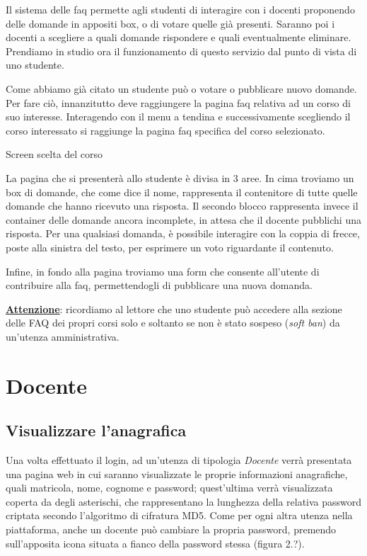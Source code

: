 \documentclass [a4paper,11pt]{book}
\begin{document}
Il sistema delle faq permette agli studenti di interagire con i docenti proponendo delle domande in appositi box, o di votare quelle già presenti. Saranno poi i docenti a scegliere a quali domande rispondere e quali eventualmente eliminare. Prendiamo in studio ora il funzionamento di questo servizio dal punto di vista di uno studente.

Come abbiamo già citato un studente può o votare o pubblicare nuovo domande. Per fare ciò, innanzitutto deve raggiungere la pagina faq relativa ad un corso di suo interesse. Interagendo con il menu a tendina e successivamente scegliendo il corso interessato si raggiunge la pagina faq specifica del corso selezionato.

Screen scelta del corso

La pagina che si presenterà allo studente è divisa in 3 aree. In cima troviamo un box di domande, che come dice il nome, rappresenta il contenitore di tutte quelle domande che hanno ricevuto una risposta. Il secondo blocco rappresenta invece il container delle domande ancora incomplete, in attesa che il docente pubblichi una risposta. Per una qualsiasi domanda, è possibile interagire con la coppia di frecce, poste alla sinistra del testo, per esprimere un voto riguardante il contenuto.

Infine, in fondo alla pagina troviamo una form che consente all'utente di contribuire alla faq, permettendogli di pubblicare una nuova domanda. 

\medskip

\textbf{\underline{Attenzione}}: ricordiamo al lettore che uno studente può accedere alla sezione delle FAQ dei propri corsi solo e soltanto se non è stato sospeso (\emph{soft ban}) da un'utenza amministrativa.

\medskip
\medskip

\section{Docente}

\subsection{Visualizzare l'anagrafica}

Una volta effettuato il login, ad un'utenza di tipologia \emph{Docente} verrà presentata una pagina web in cui saranno visualizzate le proprie informazioni anagrafiche, quali matricola, nome, cognome e password; quest'ultima verrà visualizzata coperta da degli asterischi, che rappresentano la lunghezza della relativa password criptata secondo l'algoritmo di cifratura MD5. Come per ogni altra utenza nella piattaforma, anche un docente può cambiare la propria password, premendo sull'apposita icona situata a fianco della password stessa (figura 2.?). 
\end{document}
